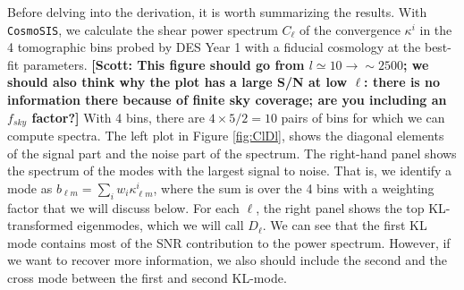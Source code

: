 \documentclass[twocolumn]{\docclass}
\newcommand{\rf}[1]{Figure \ref{fig:#1}}
\newcommand\scott[1]{{\bf [Scott: #1]}}
\begin{document}
	Before delving into the derivation, it is worth summarizing the results. With {\tt CosmoSIS}, we calculate the shear power spectrum $C_{\ell}$ of the convergence $\kappa^i$ in the 4 tomographic bins probed by DES Year 1 with a fiducial cosmology at the best-fit parameters. \scott{This figure should go from $l\simeq 10\rightarrow \sim 2500$; we should also think why the plot has a large S/N at low $\ell$: there is no information there because of finite sky coverage; are you including an $f_{sky}$ factor?} With 4 bins, there are $4\times 5/2=10$ pairs of bins for which we can compute spectra. The left plot in \rf{ClDl}, shows the diagonal elements of the signal part and the noise part of the spectrum. The right-hand panel shows the spectrum of the modes with the largest signal to noise. That is, we identify a mode as $b_{\ell m} = \sum_i w_i \kappa_{\ell m}^i$, where the sum is over the 4 bins with a weighting factor that we will discuss below. For each $\ell$, the right panel shows the top KL-transformed eigenmodes, which we will call $D_{\ell}$. We can see that the first KL mode contains most of the SNR contribution to the power spectrum. However, if we want to recover more information, we also should include the second and the cross mode between the first and second KL-mode.
	
\end{document}
